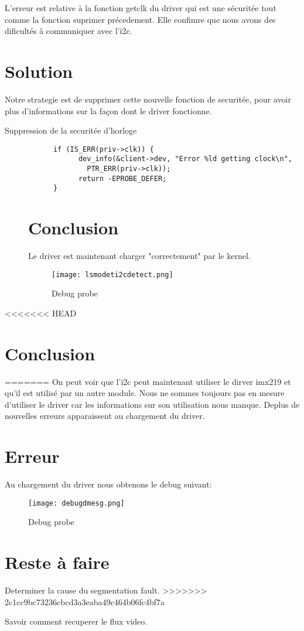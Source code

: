 L'erreur est relative à la fonction getclk du driver qui est une sécuritée tout comme la fonction suprimer précedement.
Elle confimre que nous avons des dificultés à communiquer avec l'i2c.

\section{Solution}
Notre strategie est de supprimer cette nouvelle fonction de securitée, pour avoir plus
d'informations sur la façon dont le driver fonctionne.
\begin{description}
  \item[Suppression de la securitée d'horloge]
    \begin{lstlisting}
	  if (IS_ERR(priv->clk)) {
		    dev_info(&client->dev, "Error %ld getting clock\n",
			  PTR_ERR(priv->clk));
		    return -EPROBE_DEFER;
	  }
    \end{lstlisting}
\section{Conclusion}
Le driver est maintenant charger "correctement" par le kernel.

\begin{figure}[th]
  \centering
  \texttt{[image: lsmodeti2cdetect.png]}
  \decoRule
  \caption{Debug probe}  \label{fig:planning}
\end{figure}

    \clearpage
  \end{description}

<<<<<<< HEAD
    \section{Conclusion}
=======
  On peut voir que l'i2c peut maintenant utiliser le dirver imx219 et 
  qu'il est utilisé par un autre module. Nous ne sommes toujours pas en mesure
  d'utiliser le driver car les informations sur son utilisation nous manque.
  Deplus de nouvelles erreurs apparaissent au chargement du driver.

  \section{Erreur}
  Au chargement du driver nous obtenons le debug suivant:
  
  \begin{figure}[th]
    \centering
    \texttt{[image: debugdmesg.png]}
    \decoRule
    \caption{Debug probe}  \label{fig:planning}
  \end{figure}

  \section{Reste à faire}

   Determiner la cause du segmentation fault.
>>>>>>> 2c1cc9bc73236cbcd3a3eaba49c464b06fc4bf7a

   Savoir comment recuperer le flux video.
  

